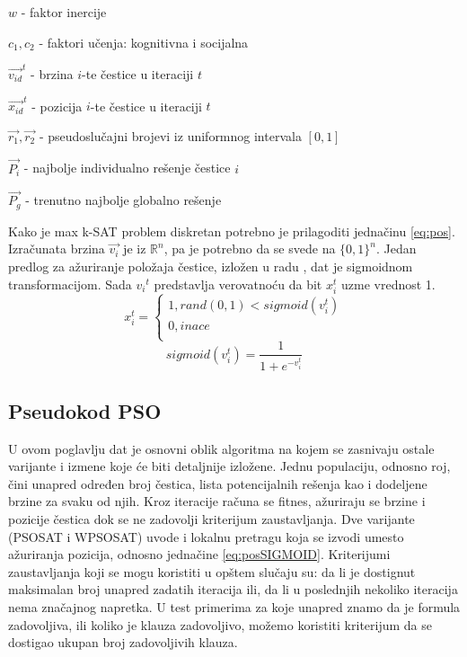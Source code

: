 \documentclass[a4paper]{article}
\begin{document}
\begin{list}{•}{}
	\item $w$ - faktor inercije
	\item $c_1, c_2$ - faktori učenja: kognitivna i socijalna
	\item $\vec{v_{id}}^{t}$ - brzina $i$-te čestice u iteraciji $t$ 
	\item $\vec{x_{id}}^{t}$ - pozicija $i$-te čestice u iteraciji $t$ 
	\item $\vec{r_1}, \vec{r_2}$ - pseudoslučajni brojevi iz uniformnog intervala $[0,1]$
	\item $\vec{P_i}$ - najbolje individualno rešenje čestice $i$
	\item $\vec{P_g}$ - trenutno najbolje globalno rešenje\\ 
\end{list}

Kako je max k-SAT problem diskretan potrebno je prilagoditi jednačinu \ref{eq:pos}. Izračunata brzina $\vec{v_{i}}$ je iz $\mathbb{R}^n$, pa je potrebno da se svede na $\{ 0,1 \}^n$. Jedan predlog za ažuriranje položaja čestice, izložen u radu \cite{sigmoid}, dat je sigmoidnom transformacijom. Sada ${v_{i}}^{t}$ predstavlja verovatnoću da bit $x_{i}^{t}$ uzme vrednost 1.  \\

\begin{equation}\label{eq:posSIGMOID}
x_{i}^{t}=\begin{cases}
               1, rand(0,1) < sigmoid(v_{i}^{t})\\
               0, inace\\
            \end{cases}
\end{equation}\label{eq:sigmoid}
\begin{equation}
sigmoid(v_{i}^{t}) = \frac{1}{1+e^{-v_{i}^{t}}}
\end{equation}
 
 
\subsection{Pseudokod PSO}
\label{sec:pso_pseudokod}
U ovom poglavlju dat je osnovni oblik algoritma na kojem se zasnivaju ostale varijante
i izmene koje će biti detaljnije izložene. Jednu populaciju, odnosno roj, čini unapred
određen broj čestica, lista potencijalnih rešenja 
kao i dodeljene brzine za svaku od njih.
Kroz iteracije računa se fitnes, ažuriraju se brzine i pozicije čestica dok se ne
zadovolji kriterijum zaustavljanja. 
Dve varijante (PSOSAT i WPSOSAT) uvode i lokalnu pretragu koja se izvodi umesto 
ažuriranja pozicija, odnosno jednačine \ref{eq:posSIGMOID}.
Kriterijumi zaustavljanja koji se mogu koristiti u opštem slučaju su: 
da li je dostignut maksimalan broj unapred zadatih iteracija ili, da li u poslednjih
nekoliko iteracija nema značajnog napretka.
U test primerima za koje unapred znamo da je formula zadovoljiva, ili koliko je klauza
zadovoljivo, možemo koristiti kriterijum da se dostigao ukupan broj zadovoljivih klauza.\\
\end{document}
